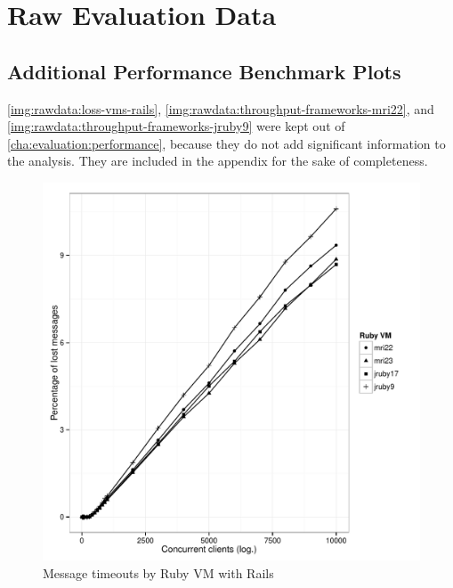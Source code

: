 \chapter{Raw Evaluation Data}
\label{cha:rawdata}

\section{Additional Performance Benchmark Plots}
\label{cha:rawdata:performance}

	\autoref{img:rawdata:loss-vms-rails},
	\ref{img:rawdata:throughput-frameworks-mri22}, and
	\ref{img:rawdata:throughput-frameworks-jruby9} were kept out of
	\autoref{cha:evaluation:performance}, because they do not add significant
	information to the analysis. They are included in the appendix for the sake
	of completeness.

	\begin{figure}[H]
		\begin{center}
			\includegraphics[width=\textwidth]{images/loss-vms-rails.pdf}
		\end{center}
		\caption{Message timeouts by Ruby \ac{VM} with \ac{Rails}}
		\label{img:rawdata:loss-vms-rails}
	\end{figure}

